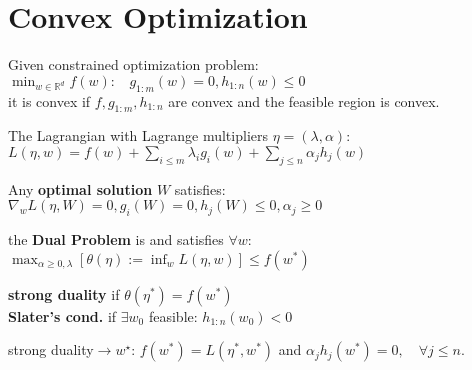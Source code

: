 \section*{Convex Optimization}

Given constrained optimization problem:
$\min_{w \in \mathbb{R}^d} f(w) :\ \ \ \  g_{1:m}(w) {=} 0,  h_{1:n}(w) {\leq} 0$ \\
it is convex if $f, g_{1:m}, h_{1:n}$ are convex and the feasible region is convex.

The Lagrangian with Lagrange multipliers $\eta = (\lambda, \alpha)$:
$L(\eta, w) = f(w) + \sum_{i \leq m} \lambda_i g_i(w) + \sum_{j \leq n} \alpha_j h_j(w)$

Any \textbf{optimal solution} $W$ satisfies:
$\nabla_w L(\eta, W) {=} 0, g_i(W) {=} 0,  h_j(W) {\leq} 0, \alpha_j {\geq} 0$

the \textbf{Dual Problem} is and satisfies $\forall w$: \\
$\max_{\alpha \geq 0,\lambda} \left[\theta(\eta) := \inf_w L(\eta, w)\right] {\leq} f(w^*)$

\textbf{strong duality} if $\theta(\eta^*) {=} f(w^*)$ \\
\textbf{Slater’s cond.} if $\exists w_0$ feasible: $h_{1:n}(w_0) {<} 0$

strong duality$\rightarrow w^\star$:
$f(w^*) {=} L(\eta^*, w^*)$ and 
$\alpha_j h_j(w^*) = 0, \quad \forall j \leq n.$




